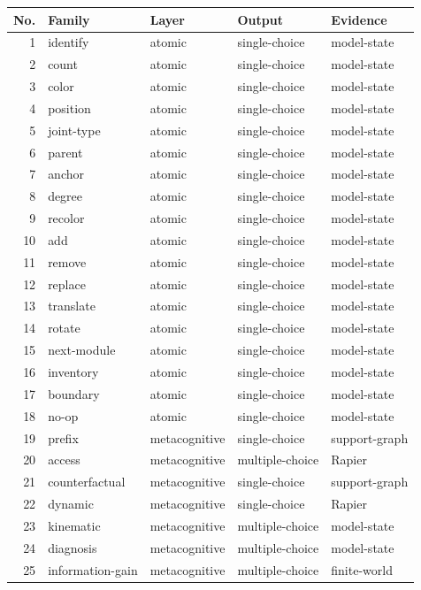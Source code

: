 \begin{center}\tiny\begin{tabular}{rllll}\toprule No. & Family & Layer & Output & Evidence\\\midrule
1 & identify & atomic & single-choice & model-state \\
2 & count & atomic & single-choice & model-state \\
3 & color & atomic & single-choice & model-state \\
4 & position & atomic & single-choice & model-state \\
5 & joint-type & atomic & single-choice & model-state \\
6 & parent & atomic & single-choice & model-state \\
7 & anchor & atomic & single-choice & model-state \\
8 & degree & atomic & single-choice & model-state \\
9 & recolor & atomic & single-choice & model-state \\
10 & add & atomic & single-choice & model-state \\
11 & remove & atomic & single-choice & model-state \\
12 & replace & atomic & single-choice & model-state \\
13 & translate & atomic & single-choice & model-state \\
14 & rotate & atomic & single-choice & model-state \\
15 & next-module & atomic & single-choice & model-state \\
16 & inventory & atomic & single-choice & model-state \\
17 & boundary & atomic & single-choice & model-state \\
18 & no-op & atomic & single-choice & model-state \\
19 & prefix & metacognitive & single-choice & support-graph \\
20 & access & metacognitive & multiple-choice & Rapier \\
21 & counterfactual & metacognitive & single-choice & support-graph \\
22 & dynamic & metacognitive & single-choice & Rapier \\
23 & kinematic & metacognitive & multiple-choice & model-state \\
24 & diagnosis & metacognitive & multiple-choice & model-state \\
25 & information-gain & metacognitive & multiple-choice & finite-world \\

\end{tabular}
\end{center}
